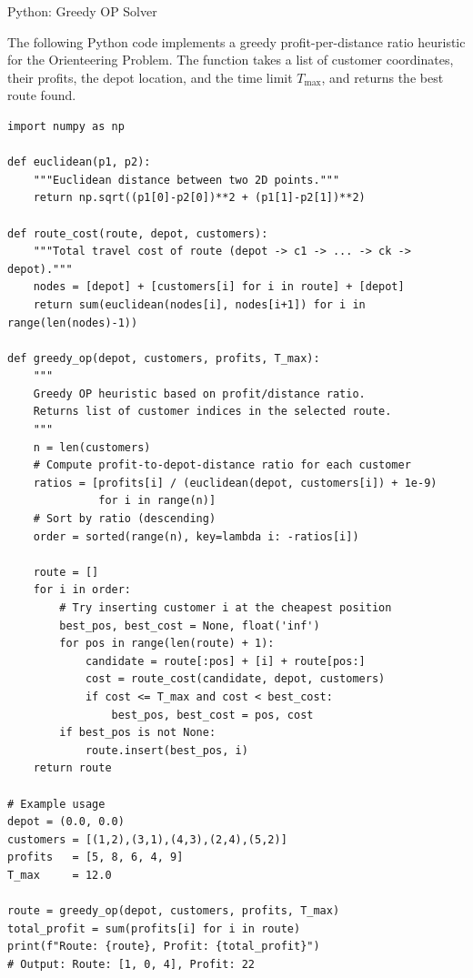 \documentclass[aspectratio=169,10pt]{beamer}
\begin{document}
\begin{frame}[fragile]{Python: Greedy OP Solver}

  The following Python code implements a greedy profit-per-distance ratio
  heuristic for the Orienteering Problem.
  The function takes a list of customer coordinates, their profits, the
  depot location, and the time limit $T_{\max}$, and returns the best
  route found.

\begin{lstlisting}
import numpy as np

def euclidean(p1, p2):
    """Euclidean distance between two 2D points."""
    return np.sqrt((p1[0]-p2[0])**2 + (p1[1]-p2[1])**2)

def route_cost(route, depot, customers):
    """Total travel cost of route (depot -> c1 -> ... -> ck -> depot)."""
    nodes = [depot] + [customers[i] for i in route] + [depot]
    return sum(euclidean(nodes[i], nodes[i+1]) for i in range(len(nodes)-1))

def greedy_op(depot, customers, profits, T_max):
    """
    Greedy OP heuristic based on profit/distance ratio.
    Returns list of customer indices in the selected route.
    """
    n = len(customers)
    # Compute profit-to-depot-distance ratio for each customer
    ratios = [profits[i] / (euclidean(depot, customers[i]) + 1e-9)
              for i in range(n)]
    # Sort by ratio (descending)
    order = sorted(range(n), key=lambda i: -ratios[i])

    route = []
    for i in order:
        # Try inserting customer i at the cheapest position
        best_pos, best_cost = None, float('inf')
        for pos in range(len(route) + 1):
            candidate = route[:pos] + [i] + route[pos:]
            cost = route_cost(candidate, depot, customers)
            if cost <= T_max and cost < best_cost:
                best_pos, best_cost = pos, cost
        if best_pos is not None:
            route.insert(best_pos, i)
    return route

# Example usage
depot = (0.0, 0.0)
customers = [(1,2),(3,1),(4,3),(2,4),(5,2)]
profits   = [5, 8, 6, 4, 9]
T_max     = 12.0

route = greedy_op(depot, customers, profits, T_max)
total_profit = sum(profits[i] for i in route)
print(f"Route: {route}, Profit: {total_profit}")
# Output: Route: [1, 0, 4], Profit: 22
\end{lstlisting}

\end{frame}
\end{document}
